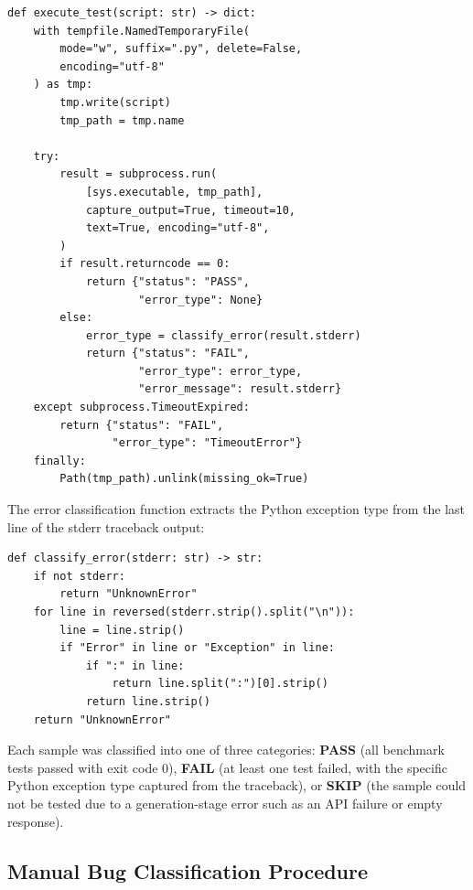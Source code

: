 \documentclass[smallextended]{svjour3}
\begin{document}
\begin{lstlisting}[caption={Test execution with isolated subprocess and error classification. Each generated code sample is executed independently with a strict timeout.},label=lst:testexec]
def execute_test(script: str) -> dict:
    with tempfile.NamedTemporaryFile(
        mode="w", suffix=".py", delete=False,
        encoding="utf-8"
    ) as tmp:
        tmp.write(script)
        tmp_path = tmp.name

    try:
        result = subprocess.run(
            [sys.executable, tmp_path],
            capture_output=True, timeout=10,
            text=True, encoding="utf-8",
        )
        if result.returncode == 0:
            return {"status": "PASS",
                    "error_type": None}
        else:
            error_type = classify_error(result.stderr)
            return {"status": "FAIL",
                    "error_type": error_type,
                    "error_message": result.stderr}
    except subprocess.TimeoutExpired:
        return {"status": "FAIL",
                "error_type": "TimeoutError"}
    finally:
        Path(tmp_path).unlink(missing_ok=True)
\end{lstlisting}

The error classification function extracts the Python exception type from the last line of the stderr traceback output:

\begin{lstlisting}[caption={Automatic error type extraction from Python traceback output.},label=lst:classify_error]
def classify_error(stderr: str) -> str:
    if not stderr:
        return "UnknownError"
    for line in reversed(stderr.strip().split("\n")):
        line = line.strip()
        if "Error" in line or "Exception" in line:
            if ":" in line:
                return line.split(":")[0].strip()
            return line.strip()
    return "UnknownError"
\end{lstlisting}

Each sample was classified into one of three categories: \textbf{PASS} (all benchmark tests passed with exit code 0), \textbf{FAIL} (at least one test failed, with the specific Python exception type captured from the traceback), or \textbf{SKIP} (the sample could not be tested due to a generation-stage error such as an API failure or empty response).

\subsection{Manual Bug Classification Procedure}
\label{sec:manual_classification}
\end{document}
